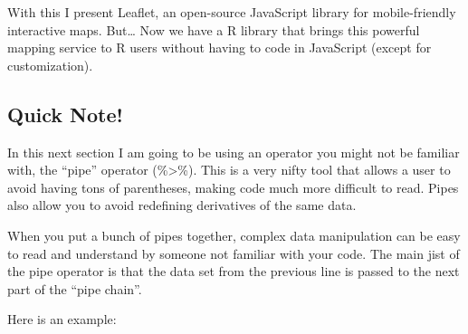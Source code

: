 \documentclass[]{article}
\newenvironment{Shaded}{\begin{snugshade}}{\end{snugshade}}
\newcommand{\CommentTok}[1]{\textcolor[rgb]{0.56,0.35,0.01}{\textit{#1}}}
\newcommand{\DecValTok}[1]{\textcolor[rgb]{0.00,0.00,0.81}{#1}}
\newcommand{\KeywordTok}[1]{\textcolor[rgb]{0.13,0.29,0.53}{\textbf{#1}}}
\newcommand{\NormalTok}[1]{#1}
\newcommand{\OperatorTok}[1]{\textcolor[rgb]{0.81,0.36,0.00}{\textbf{#1}}}
\newcommand{\StringTok}[1]{\textcolor[rgb]{0.31,0.60,0.02}{#1}}
\begin{document}
With this I present Leaflet, an open-source JavaScript library for
mobile-friendly interactive maps. But\ldots{} Now we have a R library
that brings this powerful mapping service to R users without having to
code in JavaScript (except for customization).

\hypertarget{quick-note}{%
\subsection{Quick Note!}\label{quick-note}}

In this next section I am going to be using an operator you might not be
familiar with, the ``pipe'' operator (\%\textgreater{}\%). This is a
very nifty tool that allows a user to avoid having tons of parentheses,
making code much more difficult to read. Pipes also allow you to avoid
redefining derivatives of the same data.

When you put a bunch of pipes together, complex data manipulation can be
easy to read and understand by someone not familiar with your code. The
main jist of the pipe operator is that the data set from the previous
line is passed to the next part of the ``pipe chain''.

Here is an example:

\begin{Shaded}
\end{Shaded}
\end{document}
